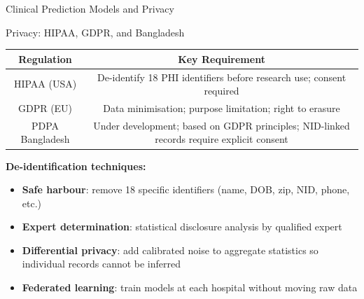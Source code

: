 \documentclass[aspectratio=169,10pt]{beamer}
\begin{document}
\begin{frame}{Clinical Prediction Models and Privacy}
 
      \begin{alertblock}{Privacy: HIPAA, GDPR, and Bangladesh}
        {\small
        \renewcommand{\arraystretch}{1.35}
        \begin{tabular}{c|c}
          \toprule
          \textbf{Regulation} & \textbf{Key Requirement} \\
          \midrule
          HIPAA (USA) & De-identify 18 PHI identifiers before research use; consent required \\
          GDPR (EU) & Data minimisation; purpose limitation; right to erasure \\
          PDPA Bangladesh & Under development; based on GDPR principles; NID-linked records require explicit consent \\
          \bottomrule
        \end{tabular}
        }
      \end{alertblock}
 
        \textbf{De-identification techniques:}
        \begin{itemize}
          \item \textbf{Safe harbour}: remove 18 specific identifiers (name, DOB, zip, NID, phone, etc.)
          \item \textbf{Expert determination}: statistical disclosure analysis by qualified expert
          \item \textbf{Differential privacy}: add calibrated noise to aggregate statistics so individual records cannot be inferred
          \item \textbf{Federated learning}: train models at each hospital without moving raw data
        \end{itemize}
\end{frame}
\end{document}
